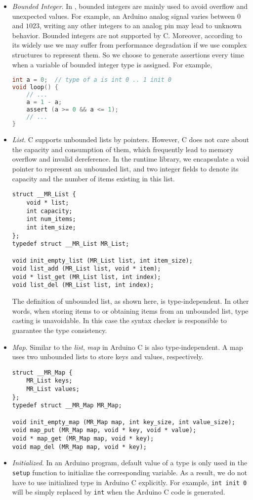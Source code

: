 \begin{itemize}
    \item \emph{Bounded Integer}. In \lang{}, bounded integers are mainly used to avoid overflow and unexpected values. For example, an Arduino analog signal varies between $0$ and $1023$, writing any other integers to an analog pin may lead to unknown behavior. Bounded integers are not supported by C. Moreover, according to its widely use we may suffer from performance degradation if we use complex structures to represent them. So we choose to generate assertions every time when a variable of bounded integer type is assigned. For example,
    \begin{lstlisting}[language=C]
int a = 0;  // type of a is int 0 .. 1 init 0
void loop() {
    // ...
    a = 1 - a;
    assert (a >= 0 && a <= 1);
    // ...
}
    \end{lstlisting}
    \item \emph{List}. C supports unbounded lists by pointers. However, C does not care about the capacity and consumption of them, which frequently lead to memory overflow and invalid dereference. In the \lang{} runtime library, we encapsulate a void pointer to represent an unbounded list, and two integer fields to denote its capacity and the number of items existing in this list.
    \begin{lstlisting}
struct __MR_List {
    void * list;
    int capacity;
    int num_items;
    int item_size;
};
typedef struct __MR_List MR_List;

void init_empty_list (MR_List list, int item_size);
void list_add (MR_List list, void * item);
void * list_get (MR_List list, int index);
void list_del (MR_List list, int index);
    \end{lstlisting}
    The definition of unbounded list, as shown here, is type-independent. In other words, when storing items to or obtaining items from an unbounded list, type casting is unavoidable. In this case the \lang{} syntax checker is responsible to guarantee the type consistency.
    \item \emph{Map}. Similar to the \emph{list}, \lang{} \emph{map} in Arduino C is also type-independent. A map uses two unbounded lists to store keys and values, respectively.
    \begin{lstlisting}
struct __MR_Map {
    MR_List keys;
    MR_List values;
};
typedef struct __MR_Map MR_Map;

void init_empty_map (MR_Map map, int key_size, int value_size);
void map_put (MR_Map map, void * key, void * value);
void * map_get (MR_Map map, void * key);
void map_del (MR_Map map, void * key);      
    \end{lstlisting}
    \item \emph{Initialized}. In an Arduino program, default value of a type is only used in the \texttt{setup} function to initialize the corresponding variable. As a result, we do not have to use initialized type in Arduino C explicitly. For example, \texttt{int init 0} will be simply replaced by \texttt{int} when the Arduino C code is generated.
\end{itemize}

